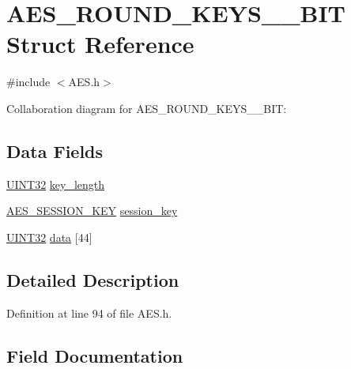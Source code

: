 \hypertarget{struct_a_e_s___r_o_u_n_d___k_e_y_s__128___b_i_t}{}\section{A\+E\+S\+\_\+\+R\+O\+U\+N\+D\+\_\+\+K\+E\+Y\+S\+\_\+\_\+\+B\+I\+T Struct Reference}
\label{struct_a_e_s___r_o_u_n_d___k_e_y_s__128___b_i_t}


{\ttfamily \#include $<$A\+E\+S.\+h$>$}



Collaboration diagram for A\+E\+S\+\_\+\+R\+O\+U\+N\+D\+\_\+\+K\+E\+Y\+S\+\_\+\_\+\+B\+I\+T\+:
\subsection*{Data Fields}
\begin{DoxyCompactItemize}
\item 
\hyperlink{_generic_type_defs_8h_a1720f33f59b583f0c2ed071815623a86}{U\+I\+N\+T32} \hyperlink{struct_a_e_s___r_o_u_n_d___k_e_y_s__128___b_i_t_aa42d871fcd1183159392e19781181b56}{key\+\_\+length}
\item 
\hyperlink{_a_e_s___e_c_b___p_i_c32_8h_a0e0971acf88a8f0e37953380fcbb10b3}{A\+E\+S\+\_\+\+S\+E\+S\+S\+I\+O\+N\+\_\+\+K\+E\+Y} \hyperlink{struct_a_e_s___r_o_u_n_d___k_e_y_s__128___b_i_t_a8188e88d5ecaef25564a4afaaf888573}{session\+\_\+key}
\item 
\hyperlink{_generic_type_defs_8h_a1720f33f59b583f0c2ed071815623a86}{U\+I\+N\+T32} \hyperlink{struct_a_e_s___r_o_u_n_d___k_e_y_s__128___b_i_t_a5430c5f7549b0972e66f824e048964aa}{data} \mbox{[}44\mbox{]}
\end{DoxyCompactItemize}


\subsection{Detailed Description}


Definition at line 94 of file A\+E\+S.\+h.



\subsection{Field Documentation}
\hypertarget{struct_a_e_s___r_o_u_n_d___k_e_y_s__128___b_i_t_a5430c5f7549b0972e66f824e048964aa}{}
